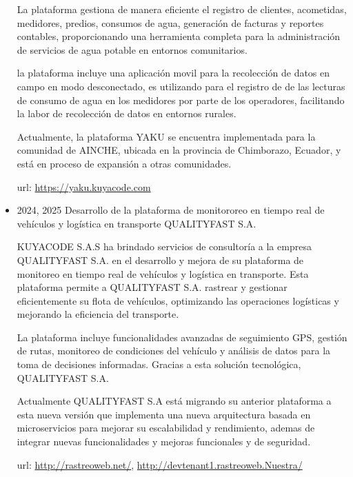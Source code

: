 \begin{itemize}
         La plataforma gestiona de manera eficiente el registro de clientes, acometidas, medidores, predios, consumos de agua, generación de facturas y reportes contables, proporcionando una herramienta completa para la administración de servicios de agua potable en entornos comunitarios.

         la plataforma incluye una aplicación movil para la recolección de datos en campo en modo desconectado, es utilizando para el registro de de las lecturas de consumo de agua en los medidores por parte de los operadores, facilitando la labor de recolección de datos en entornos rurales.

         Actualmente, la plataforma YAKU se encuentra implementada para la comunidad de AINCHE, ubicada en la provincia de Chimborazo, Ecuador, y está en proceso de expansión a otras comunidades.

         url: \url{https://yaku.kuyacode.com}
        
    \item 2024, 2025 Desarrollo de la plataforma de monitororeo en tiempo real de vehículos y logística en transporte QUALITYFAST S.A.
    
        KUYACODE S.A.S ha brindado servicios de consultoría a la empresa QUALITYFAST S.A. en el desarrollo y mejora de su plataforma de monitoreo en tiempo real de vehículos y logística en transporte. Esta plataforma permite a QUALITYFAST S.A. rastrear y gestionar eficientemente su flota de vehículos, optimizando las operaciones logísticas y mejorando la eficiencia del transporte.

        La plataforma incluye funcionalidades avanzadas de seguimiento GPS, gestión de rutas, monitoreo de condiciones del vehículo y análisis de datos para la toma de decisiones informadas. Gracias a esta solución tecnológica, QUALITYFAST S.A.
        
        Actualmente QUALITYFAST S.A está migrando su anterior plataforma a esta nueva versión que implementa una nueva arquitectura basada en microservicios para mejorar su escalabilidad y rendimiento, ademas de integrar nuevas funcionalidades y mejoras funcionales y de seguridad.

        url: \url{http://rastreoweb.net/}, \url{http://devtenant1.rastreoweb.Nuestra/}
\end{itemize}

